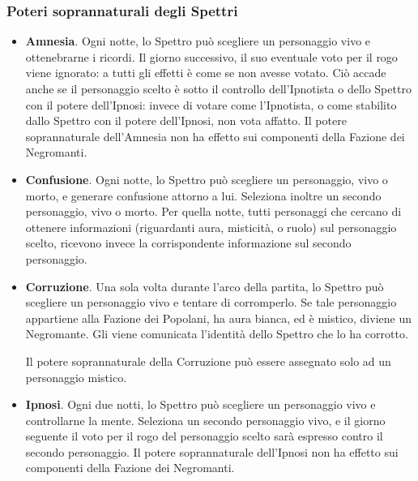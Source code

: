 \documentclass[a4paper,10pt]{article}
\begin{document}
\subsubsection*{Poteri soprannaturali degli Spettri}

\begin{itemize}
 \item {\bf Amnesia}. Ogni notte, lo Spettro può scegliere un personaggio vivo e ottenebrarne i ricordi. Il giorno successivo, il suo eventuale voto per il rogo viene ignorato: a tutti gli effetti è come se non avesse votato. Ciò accade anche se il personaggio scelto è sotto il controllo dell'Ipnotista o dello Spettro con il potere dell'Ipnosi: invece di votare come l'Ipnotista, o come stabilito dallo Spettro con il potere dell'Ipnosi, non vota affatto. Il potere soprannaturale dell'Amnesia non ha effetto sui componenti della Fazione dei Negromanti. %
 
 
 \item {\bf Confusione}. Ogni notte, lo Spettro può scegliere un personaggio, vivo o morto, e generare confusione attorno a lui. Seleziona inoltre un secondo personaggio, vivo o morto.
 Per quella notte, tutti personaggi che cercano di ottenere informazioni (riguardanti aura, misticità, o ruolo) sul personaggio scelto, ricevono invece la corrispondente informazione sul secondo personaggio.
 
 \item {\bf Corruzione}. Una sola volta durante l'arco della partita, lo Spettro può scegliere un personaggio vivo e tentare di corromperlo. Se tale personaggio appartiene alla Fazione dei Popolani, ha aura bianca, ed è mistico, diviene un Negromante. Gli viene comunicata l'identità dello Spettro che lo ha corrotto.
 
 Il potere soprannaturale della Corruzione può essere assegnato solo ad un personaggio mistico.
 
 \item{\bf Ipnosi}. Ogni due notti, lo Spettro può scegliere un personaggio vivo e controllarne la mente. Seleziona un secondo personaggio vivo, e il giorno seguente il voto per il rogo del personaggio scelto sarà espresso contro il secondo personaggio. Il potere soprannaturale dell'Ipnosi non ha effetto sui componenti della Fazione dei Negromanti. %


\end{itemize}
\end{document}

